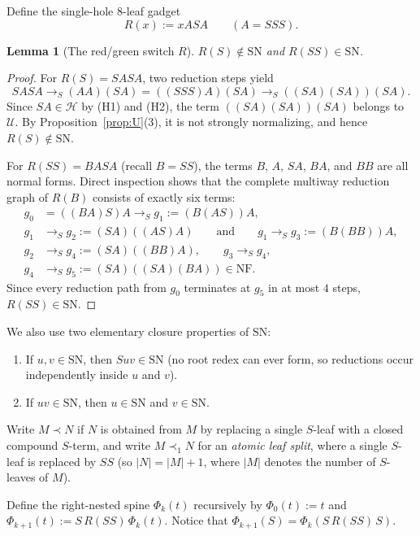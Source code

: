 \documentclass[11pt,reqno]{amsart}
\newtheorem{lemma}[theorem]{Lemma}
\theoremstyle{definition}
\theoremstyle{remark}
\newcommand{\SN}{\mathrm{SN}}
\newcommand{\NF}{\mathrm{NF}}
\newcommand{\toS}{\to_S}
\begin{document}
Define the single-hole $8$-leaf gadget
\[
  R(x) := x A S A \qquad (A = S S S).
\]

\begin{lemma}[The red/green switch $R$]\label{lem:gadget}
$R(S) \notin \SN$ and $R(S S) \in \SN$.
\end{lemma}

\begin{proof}
For $R(S) = S A S A$, two reduction steps yield
\[
  S A S A \toS (A A)(S A) = ((S S S) A)(S A) \toS ((S A)(S A))(S A).
\]
Since $S A \in \mathcal{H}$ by (H1) and (H2), the term $((S A)(S A))(S A)$ belongs to $\mathcal{U}$. By Proposition~\ref{prop:U}(3), it is not strongly normalizing, and hence $R(S) \notin \SN$.

For $R(S S) = B A S A$ (recall $B = S S$), the terms $B$, $A$, $S A$, $B A$, and $B B$ are all normal forms. Direct inspection shows that the complete multiway reduction graph of $R(B)$ consists of exactly six terms:
\begin{align*}
  g_0 &= ((B A) S) A \toS g_1 := (B (A S)) A, \\
  g_1 &\toS g_2 := (S A)((A S) A) \qquad \text{and} \qquad g_1 \toS g_3 := (B (B B)) A, \\
  g_2 &\toS g_4 := (S A)((B B) A), \qquad g_3 \toS g_4, \\
  g_4 &\toS g_5 := (S A)((S A)(B A)) \in \NF.
\end{align*}
Since every reduction path from $g_0$ terminates at $g_5$ in at most $4$ steps, $R(S S) \in \SN$.
\end{proof}

We also use two elementary closure properties of $\SN$:
\begin{enumerate}
  \item[(P1)] If $u, v \in \SN$, then $S u v \in \SN$ (no root redex can ever form, so reductions occur independently inside $u$ and $v$).
  \item[(P2)] If $u v \in \SN$, then $u \in \SN$ and $v \in \SN$.
\end{enumerate}

Write $M \prec N$ if $N$ is obtained from $M$ by replacing a single $S$-leaf with a closed compound $S$-term, and write $M \prec_1 N$ for an \emph{atomic leaf split}, where a single $S$-leaf is replaced by $S S$ (so $|N| = |M| + 1$, where $|M|$ denotes the number of $S$-leaves of $M$).

Define the right-nested spine $\Phi_k(t)$ recursively by $\Phi_0(t) := t$ and $\Phi_{k+1}(t) := S\,R(S S)\,\Phi_k(t)$. Notice that $\Phi_{k+1}(S) = \Phi_k(S\,R(S S)\,S)$.
\end{document}
